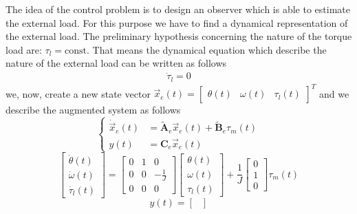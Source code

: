 \documentclass[12pt,a4paper,oneside]{book}
\begin{document}
\begin{onehalfspace}
	The idea of the control problem is to design an observer which is able to estimate the external load. For this purpose we have to find a dynamical representation of the external load. The preliminary hypothesis concerning the nature of the torque load are: $\tau_l=\text{const}$. That means the dynamical equation which describe the nature of the external load can be written as follows
	\begin{equation} \label{example_1_eq3}
		\begin{aligned}
			\dot{\tau}_l=0
		\end{aligned}
	\end{equation}
	we, now, create a new state vector $\vec{x}_e(t)=\begin{bmatrix} \theta(t) & \omega(t) & \tau_l(t)\end{bmatrix}^T$ and we describe the augmented system as follows 
	\begin{equation} \label{example_1_eq4}
		\left\lbrace \begin{aligned}
			\dot{\vec{x}}_e(t) &=\tilde{\mathbf{A}}_e\vec{x}_e(t)+\tilde{\mathbf{B}}_e\tau_m(t) \\[6pt]
			y(t) &=\mathbf{C}_e\vec{x}_e(t)
		\end{aligned}\right. 
	\end{equation}
	\begin{equation} \label{example_1_eq5}
		\begin{bmatrix}
			\dot{\theta}(t) \\[6pt]
			\dot{\omega}(t) \\[6pt]
			\dot{\tau_l}(t) 
		\end{bmatrix}=
		\begin{bmatrix}
			0 & 1 & 0 \\[6pt]
			0 & 0 & -\frac{1}{J} \\[6pt]
			0 & 0 & 0
		\end{bmatrix}
		\begin{bmatrix}
			\theta(t) \\[6pt]
			\omega(t) \\[6pt]
			\tau_l(t) 
		\end{bmatrix}+\frac{1}{J}
		\begin{bmatrix}
			0 \\[6pt]
			1 \\[6pt]
			0 
		\end{bmatrix}\tau_m(t)
	\end{equation} 
	\begin{equation} \label{example_1_eq6}
		y(t) =
		\begin{bmatrix}

\end{bmatrix}
\end{equation}
\end{onehalfspace}
\end{document}

